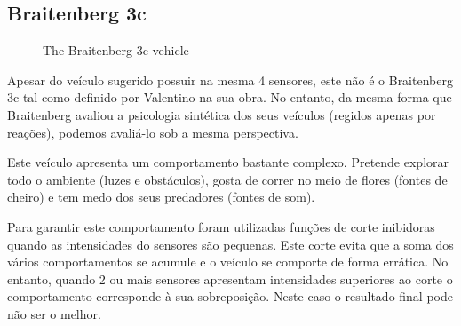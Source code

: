 \documentclass[a4paper]{article}
\begin{document}
\subsection{Braitenberg 3c}
\begin{figure}[h]
	\centering
	
	\caption{The Braitenberg 3c vehicle}
\end{figure}
Apesar do veículo sugerido possuir na mesma 4 sensores, este não é o Braitenberg 3c tal como definido por Valentino na sua obra.
No entanto, da mesma forma que Braitenberg avaliou a psicologia sintética dos seus veículos (regidos apenas por reações),
podemos avaliá-lo sob a mesma perspectiva.

Este veículo apresenta um comportamento bastante complexo. Pretende explorar todo o ambiente (luzes e obstáculos), gosta de 
correr no meio de flores (fontes de cheiro) e tem medo dos seus predadores (fontes de som). 

Para garantir este comportamento foram utilizadas funções de corte inibidoras quando as intensidades do sensores são pequenas.
Este corte evita que a soma dos vários comportamentos se acumule e o veículo se comporte de forma errática.
No entanto, quando 2 ou mais sensores apresentam intensidades superiores ao corte o comportamento corresponde à sua sobreposição.
Neste caso o resultado final pode não ser o melhor.
\end{document}
